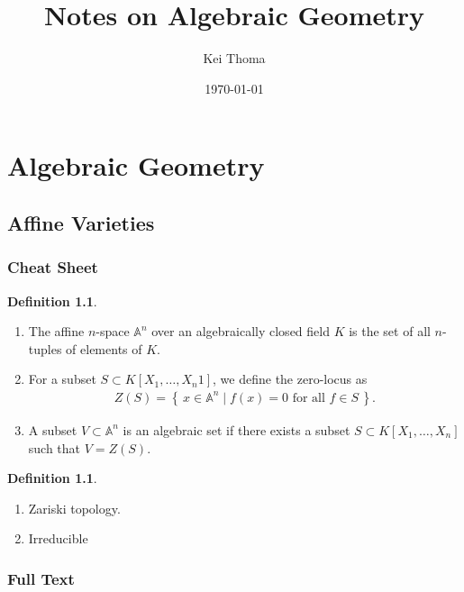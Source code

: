 \documentclass[11pt]{book}
\title{Notes on Algebraic Geometry}
\author{Kei Thoma}
\date{\today}
\theoremstyle{definition}
\newtheorem{definition}[theorem]{Definition}
\numberwithin{equation}{section}
\newcommand{\makeset}[2]{\left\{\, #1 \mathrel{\mid} #2 \,\right\}}
\begin{document}
\maketitle
\tableofcontents

\cite{hartshorne1977}
\newpage


\part{Algebraic Geometry}
\chapter{Affine Varieties}
\section*{Cheat Sheet}
\begin{defbox}
    \begin{definition}
        \begin{enumerate}
            \item The affine \(n\)-space \(\mathbb{A}^n\) over an algebraically closed field \(K\) is the set of all \(n\)-tuples of elements of \(K\).
            \item For a subset \(S \subset K[X_1, \ldots, X_n1]\), we define the zero-locus as
            \begin{align*}
                    Z(S) = \makeset{x \in \mathbb{A}^n}{f(x) = 0 \text{ for all } f \in S} \text{.}
            \end{align*}
            \item A subset \(V \subset \mathbb{A}^n\) is an algebraic set if there exists a subset \(S \subset K[X_1, \ldots, X_n]\) such that \(V = Z(S)\).
        \end{enumerate}
    \end{definition}
\end{defbox}
\begin{defbox}
    \begin{definition}
        \begin{enumerate}
            \item Zariski topology.
            \item Irreducible
        \end{enumerate}
    \end{definition}
\end{defbox}
\newpage
\section*{Full Text}
\end{document}
